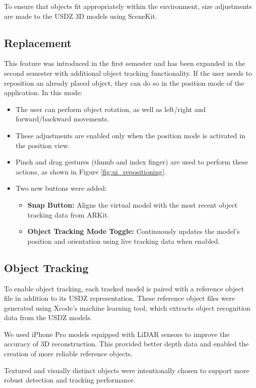 To ensure that objects fit appropriately within the environment, size adjustments are made to the USDZ 3D models using SceneKit.

\subsection{Replacement}
This feature was introduced in the first semester and has been expanded in the second semester with additional object tracking functionality. If the user needs to reposition an already placed object, they can do so in the position mode of the application. In this mode:
\begin{itemize}
    \item The user can perform object rotation, as well as left/right and forward/backward movements.
    \item These adjustments are enabled only when the position mode is activated in the position view.
    \item Pinch and drag gestures (thumb and index finger) are used to perform these actions, as shown in Figure \ref{fig:ui_repositioning}.
    \item Two new buttons were added:
    \begin{itemize}
        \item \textbf{Snap Button:} Aligns the virtual model with the most recent object tracking data from ARKit.
        \item \textbf{Object Tracking Mode Toggle:} Continuously updates the model’s position and orientation using live tracking data when enabled.
    \end{itemize}
\end{itemize}

\subsection{Object Tracking}
To enable object tracking, each tracked model is paired with a reference object file in addition to its USDZ representation. These reference object files were generated using Xcode’s machine learning tool, which extracts object recognition data from the USDZ models.

We used iPhone Pro models equipped with LiDAR sensors to improve the accuracy of 3D reconstruction. This provided better depth data and enabled the creation of more reliable reference objects.

Textured and visually distinct objects were intentionally chosen to support more robust detection and tracking performance.

